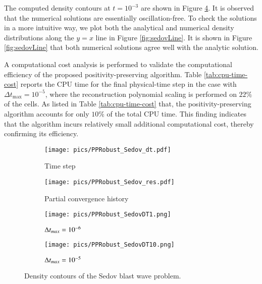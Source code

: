 The computed density contours at $t=10^{-3}$ are shown in Figure \ref{fig:sedov}. It is observed that the numerical solutions are essentially oscillation-free. To check the solutions in a more intuitive way, we plot both the analytical and numerical density distributions along the $y=x$ line in Figure \ref{fig:sedovLine}.
It is shown in Figure \ref{fig:sedovLine} that both numerical solutions agree well with the analytic solution.

A computational cost analysis is performed to validate the computational efficiency of the proposed positivity-preserving algorithm. Table \ref{tab:cpu-time-cost} reports the CPU time for the final physical-time step in the case with $\Delta t_{\text{max}} = 10^{-5}$, where the reconstruction polynomial scaling is performed on $22\%$ of the cells. As listed in Table \ref{tab:cpu-time-cost} that, the positivity-preserving algorithm accounts for only $10\%$ of the total CPU time.
This finding indicates that the algorithm incurs relatively small additional computational cost, thereby confirming its efficiency.

\begin{figure}[htbp]
    \centering
    \begin{subfigure}{0.49\textwidth}
        \texttt{[image: pics/PPRobust\_Sedov\_dt.pdf]}
        \caption[]{Time step}
        \label{sfig:sedov1_dt}
    \end{subfigure}
    \hfill
    \begin{subfigure}{0.49\textwidth}
        \texttt{[image: pics/PPRobust\_Sedov\_res.pdf]}
        \caption[]{Partial convergence history}
        \label{sfig:sedov1_res}
    \end{subfigure}
    \caption{}
    \label{fig:sedov1}
\end{figure}

\begin{figure}[htbp]
    \centering
    \begin{subfigure}{0.5\textwidth}
        \texttt{[image: pics/PPRobust\_SedovDT1.png]}
        \caption[]{$\mathrm\Delta t_{max}=10^{-6}$}
    \end{subfigure}\hfill
    \begin{subfigure}{0.5\textwidth}
        \texttt{[image: pics/PPRobust\_SedovDT10.png]}
        \caption[]{$\mathrm\Delta t_{max}=10^{-5}$}
    \end{subfigure}
    \caption{Density contours of the Sedov blast wave problem.}
    \label{fig:sedov}
\end{figure}

